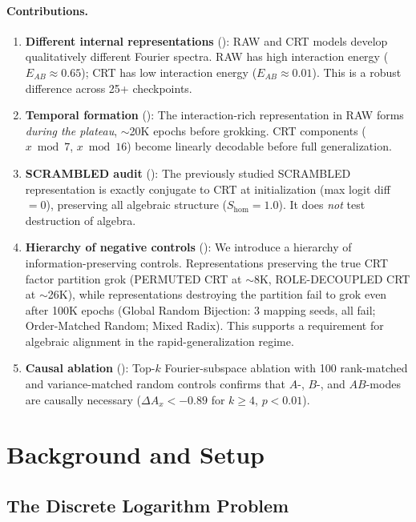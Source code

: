 \documentclass[11pt,a4paper]{article}
\theoremstyle{definition}
\theoremstyle{remark}
\newcommand{\Shom}{S_{\mathrm{hom}}}
\newcommand{\EAB}{E_{AB}}
\begin{document}
\paragraph{Contributions.}
\begin{enumerate}[leftmargin=*]
    \item \textbf{Different internal representations} (): RAW and CRT models develop qualitatively different Fourier spectra. RAW has high interaction energy ($\EAB \approx 0.65$); CRT has low interaction energy ($\EAB \approx 0.01$). This is a robust difference across 25+ checkpoints.
    \item \textbf{Temporal formation} (): The interaction-rich representation in RAW forms \emph{during the plateau}, $\sim$20K epochs before grokking. CRT components ($x \bmod 7$, $x \bmod 16$) become linearly decodable before full generalization.
    \item \textbf{SCRAMBLED audit} (): The previously studied SCRAMBLED representation is exactly conjugate to CRT at initialization (max logit diff $= 0$), preserving all algebraic structure ($\Shom = 1.0$). It does \emph{not} test destruction of algebra.
    \item \textbf{Hierarchy of negative controls} (): We introduce a hierarchy of information-preserving controls. Representations preserving the true CRT factor partition grok (PERMUTED CRT at $\sim$8K, ROLE-DECOUPLED CRT at $\sim$26K), while representations destroying the partition fail to grok even after 100K epochs (Global Random Bijection: 3 mapping seeds, all fail; Order-Matched Random; Mixed Radix). This supports a requirement for algebraic alignment in the rapid-generalization regime.
    \item \textbf{Causal ablation} (): Top-$k$ Fourier-subspace ablation with 100 rank-matched and variance-matched random controls confirms that $A$-, $B$-, and $AB$-modes are causally necessary ($\Delta A_x < -0.89$ for $k \geq 4$, $p < 0.01$).
\end{enumerate}

\section{Background and Setup}

\subsection{The Discrete Logarithm Problem}
\end{document}
